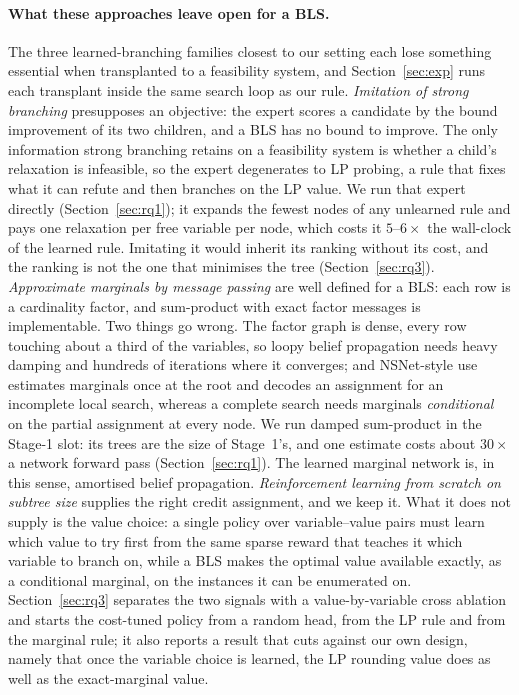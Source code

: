 \documentclass[final,5p,times,twocolumn,authoryear]{elsarticle}
\begin{document}
\paragraph{What these approaches leave open for a BLS.} The three learned-branching families closest to our setting each lose something essential when transplanted to a feasibility system, and Section~\ref{sec:exp} runs each transplant inside the same search loop as our rule.
\emph{Imitation of strong branching} \citep{khalil2016learning,gasse2019exact} presupposes an objective: the expert scores a candidate by the bound improvement of its two children, and a BLS has no bound to improve. The only information strong branching retains on a feasibility system is whether a child's relaxation is infeasible, so the expert degenerates to LP probing, a rule that fixes what it can refute and then branches on the LP value. We run that expert directly (Section~\ref{sec:rq1}); it expands the fewest nodes of any unlearned rule and pays one relaxation per free variable per node, which costs it $5$--$6\times$ the wall-clock of the learned rule. Imitating it would inherit its ranking without its cost, and the ranking is not the one that minimises the tree (Section~\ref{sec:rq3}).
\emph{Approximate marginals by message passing} \citep{li2022nsnet,montanari2007solving} are well defined for a BLS: each row is a cardinality factor, and sum-product with exact factor messages is implementable. Two things go wrong. The factor graph is dense, every row touching about a third of the variables, so loopy belief propagation needs heavy damping and hundreds of iterations where it converges; and NSNet-style use estimates marginals once at the root and decodes an assignment for an incomplete local search, whereas a complete search needs marginals \emph{conditional} on the partial assignment at every node. We run damped sum-product in the Stage-1 slot: its trees are the size of Stage~1's, and one estimate costs about $30\times$ a network forward pass (Section~\ref{sec:rq1}). The learned marginal network is, in this sense, amortised belief propagation.
\emph{Reinforcement learning from scratch on subtree size} \citep{etheve2020reinforcement,scavuzzo2022learning} supplies the right credit assignment, and we keep it. What it does not supply is the value choice: a single policy over variable--value pairs must learn which value to try first from the same sparse reward that teaches it which variable to branch on, while a BLS makes the optimal value available exactly, as a conditional marginal, on the instances it can be enumerated on. Section~\ref{sec:rq3} separates the two signals with a value-by-variable cross ablation and starts the cost-tuned policy from a random head, from the LP rule and from the marginal rule; it also reports a result that cuts against our own design, namely that once the variable choice is learned, the LP rounding value does as well as the exact-marginal value.
\end{document}
